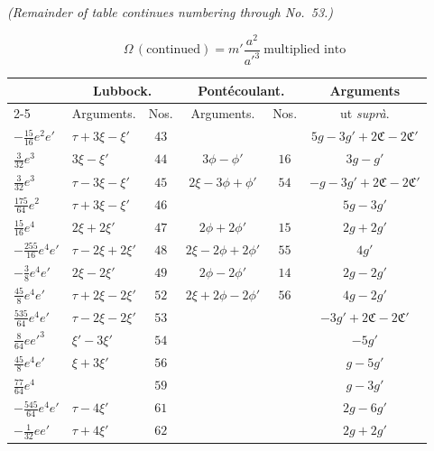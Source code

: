 \documentclass[12pt,a4paper]{article}
\theoremstyle{plain}
\begin{document}
\medskip
\noindent\hbox{}\hfill\textit{(Remainder of table continues numbering through No.~53.)}

\newpage
{}
\[
\Omega\,(\text{continued})=m'\frac{a^{2}}{a'^{3}}\ \text{multiplied into}
\]

\begin{center}
\small
\begin{tabular}{|l|l|c|c|c|c|}
\hline
& \multicolumn{2}{c|}{Lubbock.} & \multicolumn{2}{c|}{Pont\'ecoulant.} & Arguments \\
\cline{2-5}
& Arguments. & Nos. & Arguments. & Nos. & ut \textit{supr\`a}. \\
\hline
$-\tfrac{15}{16}e^{2}e'$ & $\tau+3\xi-\xi'$ & $43$ &                  &     & $5g-3g'+2\mathfrak{C}-2\mathfrak{C}'$ \\
$\tfrac{3}{32}e^{3}$     & $3\xi-\xi'$      & $44$ & $3\phi-\phi'$    & $16$ & $3g-g'$ \\
$\tfrac{3}{32}e^{3}$     & $\tau-3\xi-\xi'$ & $45$ & $2\xi-3\phi+\phi'$ & $54$ & $-g-3g'+2\mathfrak{C}-2\mathfrak{C}'$ \\
$\tfrac{175}{64}e^{2}$   & $\tau+3\xi-\xi'$ & $46$ &                  &     & $5g-3g'$ \\
$\tfrac{15}{16}e^{4}$    & $2\xi+2\xi'$     & $47$ & $2\phi+2\phi'$   & $15$ & $2g+2g'$ \\
$-\tfrac{255}{16}e^{4}e'$ & $\tau-2\xi+2\xi'$ & $48$ & $2\xi-2\phi+2\phi'$ & $55$ & $4g'$ \\
$-\tfrac{3}{8}e^{4}e'$   & $2\xi-2\xi'$     & $49$ & $2\phi-2\phi'$   & $14$ & $2g-2g'$ \\
$\tfrac{45}{8}e^{4}e'$   & $\tau+2\xi-2\xi'$ & $52$ & $2\xi+2\phi-2\phi'$ & $56$ & $4g-2g'$ \\
$\tfrac{535}{64}e^{4}e'$ & $\tau-2\xi-2\xi'$ & $53$ &                  &      & $-3g'+2\mathfrak{C}-2\mathfrak{C}'$ \\
$\tfrac{8}{64}ee'^{3}$   & $\xi'-3\xi'$     & $54$ &                  &      & $-5g'$ \\
$\tfrac{45}{8}e^{4}e'$   & $\xi+3\xi'$      & $56$ &                  &      & $g-5g'$ \\
$\tfrac{77}{64}e^{4}$    &                  & $59$ &                  &      & $g-3g'$ \\
$-\tfrac{545}{64}e^{4}e'$ & $\tau-4\xi'$    & $61$ &                  &      & $2g-6g'$ \\
$-\tfrac{1}{32}ee'$      & $\tau+4\xi'$     & $62$ &                  &      & $2g+2g'$ \\
\hline
\end{tabular}
\end{center}
\end{document}
